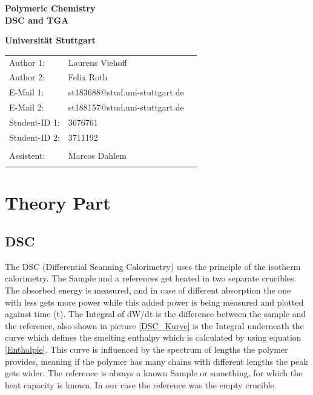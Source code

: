 \documentclass[10pt,a4paper,ngerman]{scrartcl}
\begin{document}
\begin{titlepage}
	\vspace*{2,5cm}
	\begin{center}
		\begin{LARGE}
			\textbf{Polymeric Chemistry}\\
			\textbf{DSC and TGA}\\
		\end{LARGE}
		\vspace{1cm}
		\textbf{Universität Stuttgart}\\
		\vspace*{1,5cm}
		\begin{tabular}{lp{}l}
			Author 1:     &Laurens Viehoff\\
            Author 2:     &Felix Roth\\   
			E-Mail 1:      &st183688@stud.uni-stuttgart.de\\
            E-Mail 2:      &st188157@stud.uni-stuttgart.de  \\
			Student-ID 1: & 3676761   \\ 
            Student-ID 2: & 3711192 \\ \\
			Assistent:  &Marcos Dahlem   \\ \\ 
		\end{tabular}
	\end{center}

    
\end{titlepage}
\thispagestyle{empty}
\renewcommand{\thepage}{\arabic{page}}
\newpage
\tableofcontents
\setcounter{page}{1}
\renewcommand{\thepage}{\arabic{page}}
\newpage

\section{Theory Part}

    \subsection{DSC}

        The DSC (Differential Scanning Calorimetry) uses the principle of the isotherm calorimetry. The Sample and a references get heated in two separate crucibles. 
        The absorbed energy is measured, and in case of different absorption the one with less gets more power while this added power is being measured and plotted against time (t).
        The Integral of dW/dt is the difference between the sample and the reference, also shown in picture \ref{DSC_Kurve} is the Integral underneath the curve which defines the smelting 
        enthalpy which is calculated by using equation \eqref{Enthalpie}. This curve is influenced by the spectrum of lengths the polymer provides, 
        meaning if the polymer has many chains with different lengths the peak gets wider. 
        The reference is always a known Sample or something, for which the heat capacity is known. 
        In our case the reference was the empty crucible.
\end{document}
